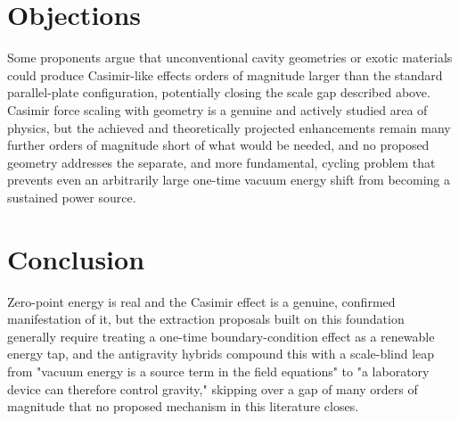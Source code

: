 \documentclass[11pt]{article}
\begin{document}
\section{Objections}

Some proponents argue that unconventional cavity geometries or exotic materials could produce Casimir-like effects orders of magnitude larger than the standard parallel-plate configuration, potentially closing the scale gap described above. Casimir force scaling with geometry is a genuine and actively studied area of physics, but the achieved and theoretically projected enhancements remain many further orders of magnitude short of what would be needed, and no proposed geometry addresses the separate, and more fundamental, cycling problem that prevents even an arbitrarily large one-time vacuum energy shift from becoming a sustained power source.

\section{Conclusion}

Zero-point energy is real and the Casimir effect is a genuine, confirmed manifestation of it, but the extraction proposals built on this foundation generally require treating a one-time boundary-condition effect as a renewable energy tap, and the antigravity hybrids compound this with a scale-blind leap from "vacuum energy is a source term in the field equations" to "a laboratory device can therefore control gravity," skipping over a gap of many orders of magnitude that no proposed mechanism in this literature closes.
\end{document}
